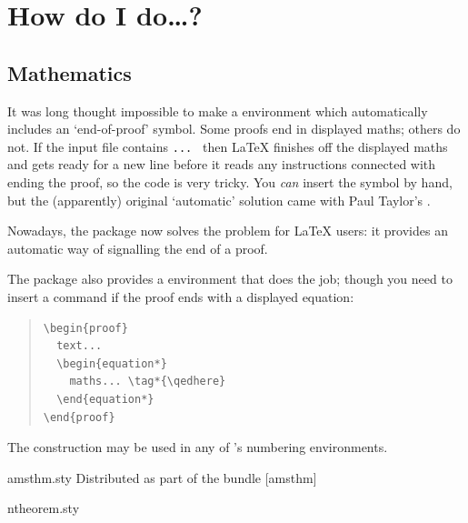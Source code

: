 \section{How do I do\dots{}?}

\subsection{Mathematics}


It was long thought impossible to make a 
environment which automatically includes an `end-of-proof' symbol.
Some proofs end in displayed maths; others do not.  If the input file
contains %
\texttt{...\csx{]} } then \LaTeX{} finishes off
the displayed maths and gets ready for a new line before it reads any
instructions connected with ending the proof, so the code is very
tricky.  You \emph{can} insert the symbol by hand, but the
(apparently) original `automatic' solution came with Paul Taylor's
.

Nowadays, the  package now solves the problem for
\LaTeX{} users: it provides an automatic way of signalling
the end of a proof.

The \AMSLaTeX{} package  also provides a
 environment that does the job; though you need to
insert a  command if the proof ends with a displayed
equation:
\begin{quote}
\begin{verbatim}
\begin{proof}
  text...
  \begin{equation*}
    maths... \tag*{\qedhere}
  \end{equation*}
\end{proof}
\end{verbatim}
\end{quote}
The  construction may be used in any of
\AMSLaTeX{}'s numbering environments.
\begin{ctanrefs}
\item[amsthm.sty]Distributed as part of the \AMSLaTeX{} bundle
  [amsthm]
\item[ntheorem.sty]
\end{ctanrefs}


